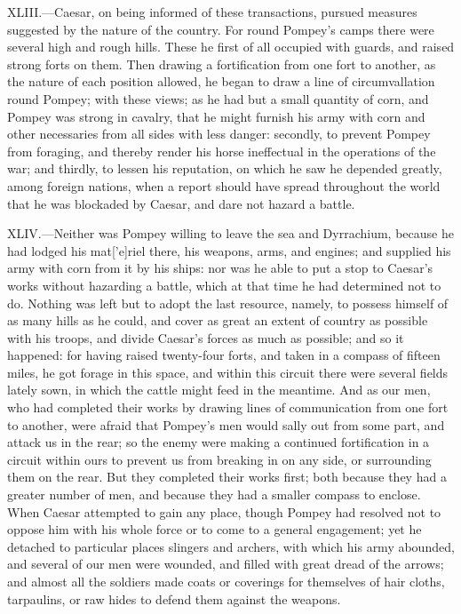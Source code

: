 XLIII.—Caesar, on being informed of these transactions, pursued
measures suggested by the nature of the country. For round Pompey's
camps there were several high and rough hills. These he first of all
occupied with guards, and raised strong forts on them. Then drawing a
fortification from one fort to another, as the nature of each position
allowed, he began to draw a line of circumvallation round Pompey; with
these views; as he had but a small quantity of corn, and Pompey was
strong in cavalry, that he might furnish his army with corn and other
necessaries from all sides with less danger: secondly, to prevent Pompey
from foraging, and thereby render his horse ineffectual in the
operations of the war; and thirdly, to lessen his reputation, on which
he saw he depended greatly, among foreign nations, when a report should
have spread throughout the world that he was blockaded by Caesar, and
dare not hazard a battle.

XLIV.—Neither was Pompey willing to leave the sea and Dyrrachium,
because he had lodged his mat['e]riel there, his weapons, arms, and
engines; and supplied his army with corn from it by his ships: nor was
he able to put a stop to Caesar's works without hazarding a battle,
which at that time he had determined not to do. Nothing was left but to
adopt the last resource, namely, to possess himself of as many hills as
he could, and cover as great an extent of country as possible with his
troops, and divide Caesar's forces as much as possible; and so it
happened: for having raised twenty-four forts, and taken in a compass of
fifteen miles, he got forage in this space, and within this circuit
there were several fields lately sown, in which the cattle might feed in
the meantime. And as our men, who had completed their works by drawing
lines of communication from one fort to another, were afraid that
Pompey's men would sally out from some part, and attack us in the rear;
so the enemy were making a continued fortification in a circuit within
ours to prevent us from breaking in on any side, or surrounding them on
the rear. But they completed their works first; both because they had a
greater number of men, and because they had a smaller compass to
enclose. When Caesar attempted to gain any place, though Pompey had
resolved not to oppose him with his whole force or to come to a general
engagement; yet he detached to particular places slingers and archers,
with which his army abounded, and several of our men were wounded, and
filled with great dread of the arrows; and almost all the soldiers made
coats or coverings for themselves of hair cloths, tarpaulins, or raw
hides to defend them against the weapons.

